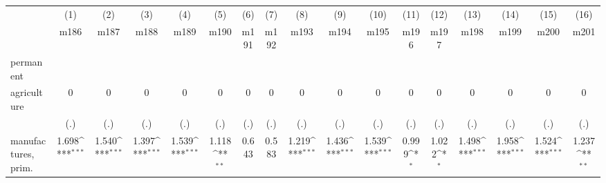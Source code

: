 {
\def\sym#1{\ifmmode^{#1}\else\(^{#1}\)\fi}
\begin{tabular}{l*{16}{c}}
\hline\hline
                    &\multicolumn{1}{c}{(1)}&\multicolumn{1}{c}{(2)}&\multicolumn{1}{c}{(3)}&\multicolumn{1}{c}{(4)}&\multicolumn{1}{c}{(5)}&\multicolumn{1}{c}{(6)}&\multicolumn{1}{c}{(7)}&\multicolumn{1}{c}{(8)}&\multicolumn{1}{c}{(9)}&\multicolumn{1}{c}{(10)}&\multicolumn{1}{c}{(11)}&\multicolumn{1}{c}{(12)}&\multicolumn{1}{c}{(13)}&\multicolumn{1}{c}{(14)}&\multicolumn{1}{c}{(15)}&\multicolumn{1}{c}{(16)}\\
                    &\multicolumn{1}{c}{m186}&\multicolumn{1}{c}{m187}&\multicolumn{1}{c}{m188}&\multicolumn{1}{c}{m189}&\multicolumn{1}{c}{m190}&\multicolumn{1}{c}{m191}&\multicolumn{1}{c}{m192}&\multicolumn{1}{c}{m193}&\multicolumn{1}{c}{m194}&\multicolumn{1}{c}{m195}&\multicolumn{1}{c}{m196}&\multicolumn{1}{c}{m197}&\multicolumn{1}{c}{m198}&\multicolumn{1}{c}{m199}&\multicolumn{1}{c}{m200}&\multicolumn{1}{c}{m201}\\
\hline
permanent           &                     &                     &                     &                     &                     &                     &                     &                     &                     &                     &                     &                     &                     &                     &                     &                     \\
agriculture         &           0         &           0         &           0         &           0         &           0         &           0         &           0         &           0         &           0         &           0         &           0         &           0         &           0         &           0         &           0         &           0         \\
                    &         (.)         &         (.)         &         (.)         &         (.)         &         (.)         &         (.)         &         (.)         &         (.)         &         (.)         &         (.)         &         (.)         &         (.)         &         (.)         &         (.)         &         (.)         &         (.)         \\
[1em]
manufactures, prim. &       1.698\sym{***}&       1.540\sym{***}&       1.397\sym{***}&       1.539\sym{***}&       1.118\sym{**} &       0.643         &       0.583         &       1.219\sym{***}&       1.436\sym{***}&       1.539\sym{***}&       0.999\sym{*}  &       1.022\sym{*}  &       1.498\sym{***}&       1.958\sym{***}&       1.524\sym{***}&       1.237\sym{**} \\

\end{tabular}}
